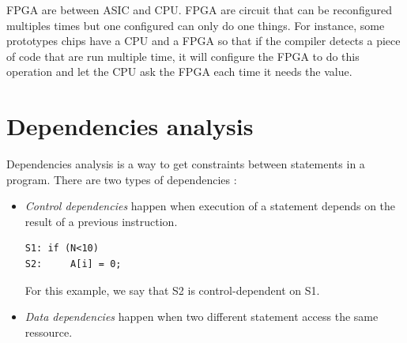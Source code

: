 \ac{FPGA} are between \ac{ASIC} and \ac{CPU}. \ac{FPGA} are circuit that can be reconfigured multiples times but one configured can only do one things. For instance, some prototypes chips have a \ac{CPU} and a \ac{FPGA} so that if the compiler detects a piece of code that are run multiple time, it will configure the \ac{FPGA} to do this operation and let the \ac{CPU} ask the \ac{FPGA} each time it needs the value.  

\section{Dependencies analysis}
Dependencies analysis is a way to get constraints between statements in a program. There are two types of dependencies :
\begin{itemize}
\item \emph{Control dependencies} happen when execution of a statement depends on the result of a previous instruction. 
\begin{lstlisting}[frame=single]
S1: if (N<10)
S2:     A[i] = 0;
\end{lstlisting}

For this example, we say that S2 is control-dependent on S1.


\item \emph{Data dependencies} happen when two different statement access the same ressource.
\end{itemize}

